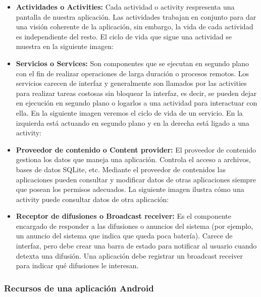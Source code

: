 \begin{itemize}
\item \textbf{Actividades o Activities:} Cada actividad o activity respresenta una pantalla de nuestra aplicación. Las actividades trabajan en conjunto para dar una visión coherente de la aplicación, sin embargo, la vida de cada actividad es independiente del resto. El ciclo de vida que sigue una actividad se muestra en la siguiente imagen:
\item \textbf{Servicios o Services:} Son componentes que se ejecutan en segundo plano con el fin de realizar operaciones de larga duración o procesos remotos. Los servicios carecen de interfaz y generalmente son llamados por las activities para realizar tareas costosas sin bloquear la interfaz, es decir, se pueden dejar en ejecución en segundo plano o logarlos a una actividad para interactuar con ella. En la siguiente imagen veremos el ciclo de vida de un servicio. En la izquierda está actuando en segundo plano y en la derecha está ligado a una activity:
\item \textbf{Proveedor de contenido o Content provider:} El proveedor de contenido gestiona los datos que maneja una aplicación. Controla el acceso a archivos, bases de datos SQLite, etc. Mediante el proveedor de contenidos las aplicaciones pueden consultar y modificar datos de otras aplicaciones siempre que posean los permisos adecuados. La siguiente imagen ilustra cómo una activity puede consultar datos de otra aplicación:
\item \textbf{Receptor de difusiones o Broadcast receiver:} Es el componente encargado de responder a las difusiones o anuncios del sistema (por ejemplo, un anuncio del sistema que indica que queda poca batería). Carece de interfaz, pero debe crear una barra de estado para notificar al usuario cuando detexta una difusión. Una aplicación debe registrar un broadcast receiver para indicar qué difusiones le interesan.
\end{itemize}

\subsubsection{Recursos de una aplicación Android}

